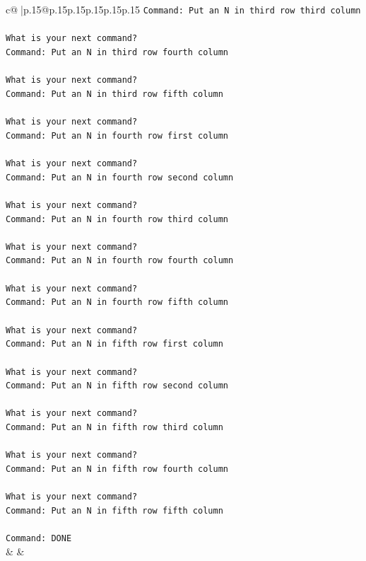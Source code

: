 \documentclass{article}
\begin{document}
{\begin{supertabular}{c@{$\;$}|p{.15\linewidth}@{}p{.15\linewidth}p{.15\linewidth}p{.15\linewidth}p{.15\linewidth}p{.15\linewidth}}
{{{\texttt{Command: Put an N in third row third column} \\
\\ 
\texttt{What is your next command?} \\
\texttt{Command: Put an N in third row fourth column} \\
\\ 
\texttt{What is your next command?} \\
\texttt{Command: Put an N in third row fifth column} \\
\\ 
\texttt{What is your next command?} \\
\texttt{Command: Put an N in fourth row first column} \\
\\ 
\texttt{What is your next command?} \\
\texttt{Command: Put an N in fourth row second column} \\
\\ 
\texttt{What is your next command?} \\
\texttt{Command: Put an N in fourth row third column} \\
\\ 
\texttt{What is your next command?} \\
\texttt{Command: Put an N in fourth row fourth column} \\
\\ 
\texttt{What is your next command?} \\
\texttt{Command: Put an N in fourth row fifth column} \\
\\ 
\texttt{What is your next command?} \\
\texttt{Command: Put an N in fifth row first column} \\
\\ 
\texttt{What is your next command?} \\
\texttt{Command: Put an N in fifth row second column} \\
\\ 
\texttt{What is your next command?} \\
\texttt{Command: Put an N in fifth row third column} \\
\\ 
\texttt{What is your next command?} \\
\texttt{Command: Put an N in fifth row fourth column} \\
\\ 
\texttt{What is your next command?} \\
\texttt{Command: Put an N in fifth row fifth column} \\
\\ 
\texttt{Command: DONE} \\
            }
        }
    }
    & & \\ \\


\end{supertabular}}
\end{document}
